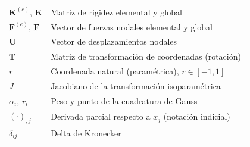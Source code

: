 \begin{center}
\begin{tabular}{@{}ll@{}}
$\mathbf{K}^{(e)}$, $\mathbf{K}$ & Matriz de rigidez elemental y global \\
$\mathbf{F}^{(e)}$, $\mathbf{F}$ & Vector de fuerzas nodales elemental y global \\
$\mathbf{U}$ & Vector de desplazamientos nodales \\
$\mathbf{T}$ & Matriz de transformación de coordenadas (rotación) \\
$r$ & Coordenada natural (paramétrica), $r \in [-1,1]$ \\
$J$ & Jacobiano de la transformación isoparamétrica \\
$\alpha_i$, $r_i$ & Peso y punto de la cuadratura de Gauss \\
$(\cdot)_{,j}$ & Derivada parcial respecto a $x_j$ (notación indicial) \\
$\delta_{ij}$ & Delta de Kronecker \\
\bottomrule
\end{tabular}
\end{center}
